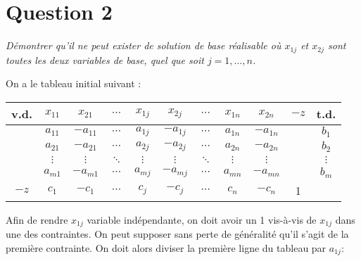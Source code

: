 \section*{Question 2}
\setcounter{subsection}{0}

\emph{Démontrer qu’il ne peut exister de solution de base réalisable où $x_{1j}$ et $x_{2j}$ sont toutes les deux variables de base, quel que soit $j = 1, \dots, n$.}

On a le tableau initial suivant :

\begin{center}
	\renewcommand{\arraystretch}{1.5}
	\begin{tabular}{|c| ccccccccc|c|}
		\hline
		v.d. & $x_{11}$ & $x_{21}$  & $\cdots$ & $x_{1j}$ & $x_{2j}$  & $\cdots$ & $x_{1n}$ & $x_{2n}$  & $-z$ &   t.d.   \\ \hline
		     & $a_{11}$ & $-a_{11}$ & $\cdots$ & $a_{1j}$ & $-a_{1j}$ & $\cdots$ & $a_{1n}$ & $-a_{1n}$ &      &  $b_1$   \\
		     & $a_{21}$ & $-a_{21}$ & $\cdots$ & $a_{2j}$ & $-a_{2j}$ & $\cdots$ & $a_{2n}$ & $-a_{2n}$ &      &  $b_2$   \\
		     & $\vdots$ & $\vdots$  & $\ddots$ & $\vdots$ & $\vdots$  & $\ddots$ & $\vdots$ & $\vdots$  &      & $\vdots$ \\
		     & $a_{m1}$ & $-a_{m1}$ & $\cdots$ & $a_{mj}$ & $-a_{mj}$ & $\cdots$ & $a_{mn}$ & $-a_{mn}$ &      &  $b_m$   \\ \hline
		$-z$ & $c_1$    &  $-c_1$   & $\cdots$ &  $c_j$   &  $-c_j$   & $\cdots$ &  $c_n$   &  $-c_n$   &  1   &          \\ \hline
	\end{tabular}
\end{center}

Afin de rendre $x_{1j}$ variable indépendante, on doit avoir un 1 vis-à-vis de $x_{1j}$ dans une des contraintes. On peut supposer sans perte de généralité qu’il s’agit de la première contrainte. On doit alors diviser la première ligne du tableau par $a_{1j}$:

